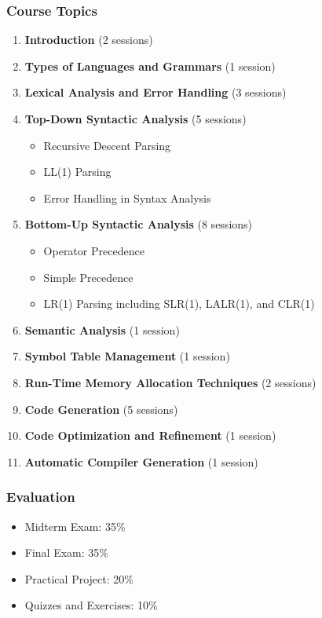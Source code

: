 \documentclass[12pt]{article}
\begin{document}
\subsubsection*{Course Topics}
\begin{enumerate}
    \item \textbf{Introduction} (2 sessions)
    \item \textbf{Types of Languages and Grammars} (1 session)
    \item \textbf{Lexical Analysis and Error Handling} (3 sessions)
    \item \textbf{Top-Down Syntactic Analysis} (5 sessions)
    \begin{itemize}
        \item Recursive Descent Parsing
        \item LL(1) Parsing
        \item Error Handling in Syntax Analysis
    \end{itemize}
    \item \textbf{Bottom-Up Syntactic Analysis} (8 sessions)
    \begin{itemize}
        \item Operator Precedence
        \item Simple Precedence
        \item LR(1) Parsing including SLR(1), LALR(1), and CLR(1)
    \end{itemize}
    \item \textbf{Semantic Analysis} (1 session)
    \item \textbf{Symbol Table Management} (1 session)
    \item \textbf{Run-Time Memory Allocation Techniques} (2 sessions)
    \item \textbf{Code Generation} (5 sessions)
    \item \textbf{Code Optimization and Refinement} (1 session)
    \item \textbf{Automatic Compiler Generation} (1 session)
\end{enumerate}

\subsubsection*{Evaluation}
\begin{itemize}
    \item Midterm Exam: 35\%
    \item Final Exam: 35\%
    \item Practical Project: 20\%
    \item Quizzes and Exercises: 10\%
\end{itemize}
\end{document}
